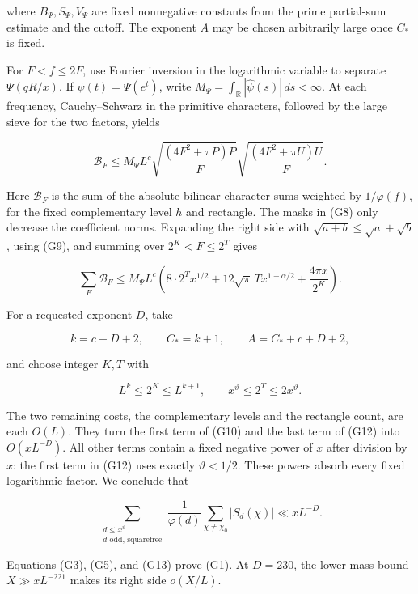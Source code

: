 where \(B_\Psi,S_\Psi,V_\Psi\) are fixed nonnegative constants from the
prime partial-sum estimate and the cutoff. The exponent \(A\) may be
chosen arbitrarily large once \(C_*\) is fixed.

For \(F<f\le2F\), use Fourier inversion in the logarithmic variable to
separate \(\Psi(qR/x)\). If \(\psi(t)=\Psi(e^t)\), write
\(M_\Psi=\int_{\mathbb R}|\widehat\psi(s)|\,ds<\infty\). At each
frequency, Cauchy--Schwarz in the primitive characters, followed by the
large sieve for the two factors, yields

\[
\mathcal B_F\le M_\Psi L^c
 \sqrt{\frac{(4F^2+\pi P)P}{F}}
 \sqrt{\frac{(4F^2+\pi U)U}{F}}. \tag{G11}
\]

Here \(\mathcal B_F\) is the sum of the absolute bilinear character sums
weighted by \(1/\varphi(f)\), for the fixed complementary level \(h\)
and rectangle. The masks in (G8) only decrease the coefficient norms.
Expanding the right side with \(\sqrt{a+b}\le\sqrt a+\sqrt b\), using
(G9), and summing over \(2^K<F\le2^T\) gives

\[
\sum_F\mathcal B_F\le M_\Psi L^c\left(
8\cdot2^T x^{1/2}
+12\sqrt\pi\,T x^{1-\alpha/2}
+\frac{4\pi x}{2^K}\right). \tag{G12}
\]

For a requested exponent \(D\), take

\[
k=c+D+2,\qquad C_*=k+1,\qquad A=C_*+c+D+2,
\]

and choose integer \(K,T\) with

\[
L^k\le2^K\le L^{k+1},\qquad
x^\vartheta\le2^T\le2x^\vartheta.
\]

The two remaining costs, the complementary levels and the rectangle
count, are each \(O(L)\). They turn the first term of (G10) and the last
term of (G12) into \(O(xL^{-D})\). All other terms contain a fixed
negative power of \(x\) after division by \(x\): the first term in (G12)
uses exactly \(\vartheta<1/2\). These powers absorb every fixed
logarithmic factor. We conclude that

\[
\sum_{\substack{d\le x^\vartheta\\d\text{ odd, squarefree}}}
 \frac1{\varphi(d)}\sum_{\chi\ne\chi_0}|S_d(\chi)|
 \ll xL^{-D}. \tag{G13}
\]

Equations (G3), (G5), and (G13) prove (G1). At \(D=230\), the lower mass
bound \(X\gg xL^{-221}\) makes its right side \(o(X/L)\).
